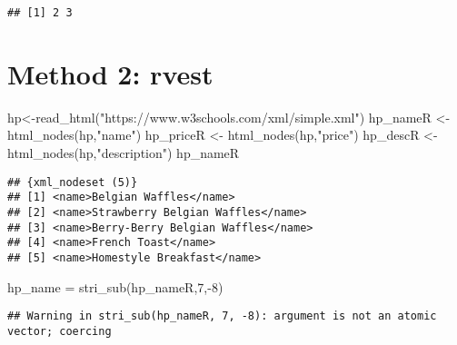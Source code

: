 \documentclass[
]{article}
\newenvironment{Shaded}{\begin{snugshade}}{\end{snugshade}}
\newcommand{\DecValTok}[1]{\textcolor[rgb]{0.00,0.00,0.81}{#1}}
\newcommand{\FunctionTok}[1]{\textcolor[rgb]{0.00,0.00,0.00}{#1}}
\newcommand{\NormalTok}[1]{#1}
\newcommand{\OtherTok}[1]{\textcolor[rgb]{0.56,0.35,0.01}{#1}}
\newcommand{\SpecialCharTok}[1]{\textcolor[rgb]{0.00,0.00,0.00}{#1}}
\newcommand{\StringTok}[1]{\textcolor[rgb]{0.31,0.60,0.02}{#1}}
\begin{document}
\begin{Shaded}
\end{Shaded}

\begin{verbatim}
## [1] 2 3
\end{verbatim}

\hypertarget{method-2-rvest}{%
\section{Method 2: rvest}\label{method-2-rvest}}

\begin{Shaded}
\begin{Highlighting}[]
\NormalTok{hp}\OtherTok{\textless{}{-}}\FunctionTok{read\_html}\NormalTok{(}\StringTok{"https://www.w3schools.com/xml/simple.xml"}\NormalTok{)}
\NormalTok{hp\_nameR }\OtherTok{\textless{}{-}} \FunctionTok{html\_nodes}\NormalTok{(hp,}\StringTok{"name"}\NormalTok{)}
\NormalTok{hp\_priceR }\OtherTok{\textless{}{-}} \FunctionTok{html\_nodes}\NormalTok{(hp,}\StringTok{"price"}\NormalTok{)}
\NormalTok{hp\_descR }\OtherTok{\textless{}{-}} \FunctionTok{html\_nodes}\NormalTok{(hp,}\StringTok{"description"}\NormalTok{)}
\NormalTok{hp\_nameR}
\end{Highlighting}
\end{Shaded}

\begin{verbatim}
## {xml_nodeset (5)}
## [1] <name>Belgian Waffles</name>
## [2] <name>Strawberry Belgian Waffles</name>
## [3] <name>Berry-Berry Belgian Waffles</name>
## [4] <name>French Toast</name>
## [5] <name>Homestyle Breakfast</name>
\end{verbatim}

\begin{Shaded}
\begin{Highlighting}[]
\NormalTok{hp\_name }\OtherTok{=} \FunctionTok{stri\_sub}\NormalTok{(hp\_nameR,}\DecValTok{7}\NormalTok{,}\SpecialCharTok{{-}}\DecValTok{8}\NormalTok{)}
\end{Highlighting}
\end{Shaded}

\begin{verbatim}
## Warning in stri_sub(hp_nameR, 7, -8): argument is not an atomic vector; coercing
\end{verbatim}
\end{document}
